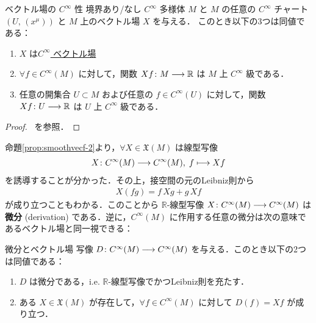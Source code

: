 \documentclass[TQFT_main]{subfiles}
\begin{document}
\begin{myprop}[label=prop:smoothvecf-2]{ベクトル場の $C^\infty$ 性}
    境界あり/なし $C^\infty$ 多様体 $M$ と $M$ の任意の $C^\infty$ チャート $(U,\, (x^\mu))$ と $M$ 上のベクトル場 $X$ を与える．
    このとき以下の3つは同値である：
    \begin{enumerate}
        \item $X$ は\hyperref[def:vecf]{$C^\infty$ ベクトル場}
        \item $\forall f \in C^\infty (M)$ に対して，関数 $Xf \colon M \longrightarrow \mathbb{R}$ は $M$ 上 $C^\infty$ 級である．
        \item 任意の開集合 $U \subset M$ および任意の $f \in C^\infty (U)$ に対して，関数 $Xf \colon U \longrightarrow \mathbb{R}$ は $U$ 上 $C^\infty$ 級である．
    \end{enumerate}
    
\end{myprop}

\begin{proof}
    ~\cite[p.180, Proposition 8.14]{Lee2012smooth}を参照．
\end{proof}

命題\ref{prop:smoothvecf-2}より，$\forall X \in \mathfrak{X}(M)$ は線型写像
\begin{align}
    X \colon C^\infty (M) \longrightarrow C^\infty(M),\; f \longmapsto Xf
\end{align}
を誘導することが分かった．その上，接空間の元のLeibniz則から
\begin{align}
    X(fg) = f\, Xg + g\, Xf
\end{align}
が成り立つこともわかる．このことから $\mathbb{R}$-線型写像 $X \colon C^\infty (M) \longrightarrow C^\infty(M)$ は\textbf{微分} (derivation) である．逆に，$C^\infty(M)$ に作用する任意の微分は次の意味であるベクトル場と同一視できる：

\begin{myprop}[label=prop:vecf-derivation]{微分とベクトル場}
    写像 $D \colon C^\infty (M) \longrightarrow C^\infty(M)$ を与える．このとき以下の2つは同値である：
    \begin{enumerate}
        \item $D$ は微分である，i.e. $\mathbb{R}$-線型写像でかつLeibniz則を充たす．
        \item ある $X \in \mathfrak{X}(M)$ が存在して，$\forall f \in C^\infty(M)$ に対して $D(f) = Xf$ が成り立つ．
    \end{enumerate}
\end{myprop}
\end{document}
